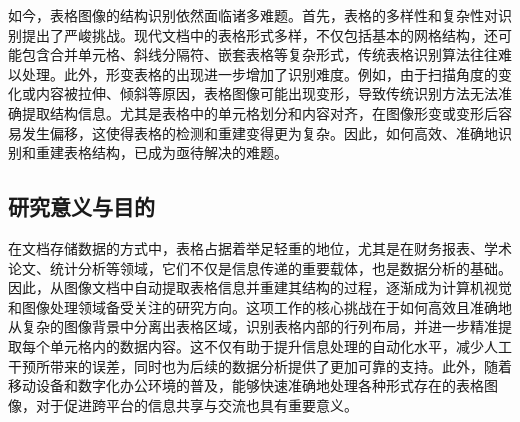 \documentclass[../article.tex]{subfiles} %
\begin{document}
如今，表格图像的结构识别依然面临诸多难题。首先，表格的多样性和复杂性对识别提出了严峻挑战。现代文档中的表格形式多样，不仅包括基本的网格结构，还可能包含合并单元格、斜线分隔符、嵌套表格等复杂形式，传统表格识别算法往往难以处理。此外，形变表格的出现进一步增加了识别难度。例如，由于扫描角度的变化或内容被拉伸、倾斜等原因，表格图像可能出现变形，导致传统识别方法无法准确提取结构信息。尤其是表格中的单元格划分和内容对齐，在图像形变或变形后容易发生偏移，这使得表格的检测和重建变得更为复杂。因此，如何高效、准确地识别和重建表格结构，已成为亟待解决的难题。

\subsection{研究意义与目的}

在文档存储数据的方式中，表格占据着举足轻重的地位，尤其是在财务报表、学术论文、统计分析等领域，它们不仅是信息传递的重要载体，也是数据分析的基础。因此，从图像文档中自动提取表格信息并重建其结构的过程，逐渐成为计算机视觉和图像处理领域备受关注的研究方向。这项工作的核心挑战在于如何高效且准确地从复杂的图像背景中分离出表格区域，识别表格内部的行列布局，并进一步精准提取每个单元格内的数据内容。这不仅有助于提升信息处理的自动化水平，减少人工干预所带来的误差，同时也为后续的数据分析提供了更加可靠的支持。此外，随着移动设备和数字化办公环境的普及，能够快速准确地处理各种形式存在的表格图像，对于促进跨平台的信息共享与交流也具有重要意义。
\end{document}

